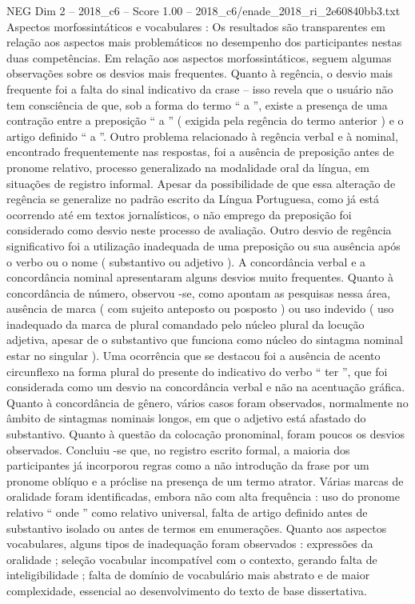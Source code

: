 \begin{textsample}{NEG Dim 2 – 2018\_c6 – Score 1.00 – 2018\_c6/enade\_2018\_ri\_2e60840bb3.txt}
Aspectos morfossintáticos e vocabulares : Os resultados são transparentes em relação aos aspectos mais problemáticos no desempenho dos participantes nestas duas competências.
Em relação aos aspectos morfossintáticos, seguem algumas observações sobre os desvios mais frequentes.
Quanto à regência, o desvio mais frequente foi a falta do sinal indicativo da crase – isso revela que o usuário não tem consciência de que, sob a forma do termo “ a ”, existe a presença de uma contração entre a preposição “ a ” ( exigida pela regência do termo anterior ) e o artigo definido “ a ”.
Outro problema relacionado à regência verbal e à nominal, encontrado frequentemente nas respostas, foi a ausência de preposição antes de pronome relativo, processo generalizado na modalidade oral da língua, em situações de registro informal.
Apesar da possibilidade de que essa alteração de regência se generalize no padrão escrito da Língua Portuguesa, como já está ocorrendo até em textos jornalísticos, o não emprego da preposição foi considerado como desvio neste processo de avaliação.
Outro desvio de regência significativo foi a utilização inadequada de uma preposição ou sua ausência após o verbo ou o nome ( substantivo ou adjetivo ).
A concordância verbal e a concordância nominal apresentaram alguns desvios muito frequentes.
Quanto à concordância de número, observou -se, como apontam as pesquisas nessa área, ausência de marca ( com sujeito anteposto ou posposto ) ou uso indevido ( uso inadequado da marca de plural comandado pelo núcleo plural da locução adjetiva, apesar de o substantivo que funciona como núcleo do sintagma nominal estar no singular ).
Uma ocorrência que se destacou foi a ausência de acento circunflexo na forma plural do presente do indicativo do verbo “ ter ”, que foi considerada como um desvio na concordância verbal e não na acentuação gráfica.
Quanto à concordância de gênero, vários casos foram observados, normalmente no âmbito de sintagmas nominais longos, em que o adjetivo está afastado do substantivo.
Quanto à questão da colocação pronominal, foram poucos os desvios observados.
Concluiu -se que, no registro escrito formal, a maioria dos participantes já incorporou regras como a não introdução da frase por um pronome oblíquo e a próclise na presença de um termo atrator.
Várias marcas de oralidade foram identificadas, embora não com alta frequência : uso do pronome relativo “ onde ” como relativo universal, falta de artigo definido antes de substantivo isolado ou antes de termos em enumerações.
Quanto aos aspectos vocabulares, alguns tipos de inadequação foram observados : expressões da oralidade ; seleção vocabular incompatível com o contexto, gerando falta de inteligibilidade ; falta de domínio de vocabulário mais abstrato e de maior complexidade, essencial ao desenvolvimento do texto de base dissertativa.

\end{textsample}
